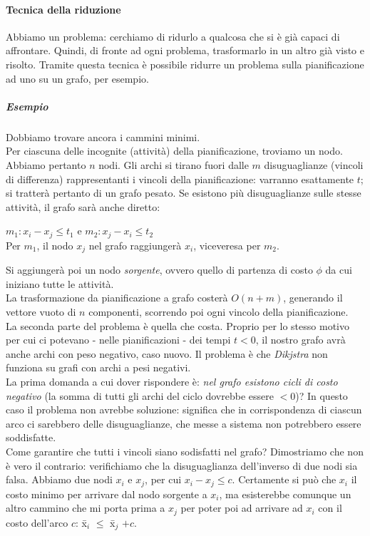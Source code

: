 \paragraph{Tecnica della riduzione}
Abbiamo un problema: cerchiamo di ridurlo a qualcosa che si è già capaci di affrontare. Quindi, di fronte ad ogni problema, trasformarlo in un altro già visto e risolto. Tramite questa tecnica è possibile ridurre un problema sulla pianificazione ad uno su un grafo, per esempio.
\subparagraph{Esempio}
Dobbiamo trovare ancora i cammini minimi. \\
Per ciascuna delle incognite (attività) della pianificazione, troviamo un nodo. Abbiamo pertanto $n$ nodi. Gli archi si tirano fuori dalle $m$ disuguaglianze (vincoli di differenza) rappresentanti i vincoli della pianificazione: varranno esattamente $t$; si tratterà pertanto di un grafo pesato. Se esistono più disuguaglianze sulle stesse attività, il grafo sarà anche diretto:
\begin{center}
	$m_1 : x_i - x_j \leq t_1$ e $m_2 : x_j - x_i \leq t_2$ \\
	Per $m_1$, il nodo $x_j$ nel grafo raggiungerà $x_i$, viceveresa per $m_2$.
\end{center}
Si aggiungerà poi un nodo \textit{sorgente}, ovvero quello di partenza di costo $\phi$ da cui iniziano tutte le attività. \\
La trasformazione da pianificazione a grafo costerà $O(n+m)$, generando il vettore vuoto di $n$ componenti, scorrendo poi ogni vincolo della pianificazione. \\
La seconda parte del problema è quella che costa. Proprio per lo stesso motivo per cui ci potevano - nelle pianificazioni - dei tempi $t < 0$, il nostro grafo avrà anche archi con peso negativo, caso nuovo. Il problema è che \textit{Dikjstra} non funziona su grafi con archi a pesi negativi. \\
La prima domanda a cui dover rispondere è: \textit{nel grafo esistono cicli di costo negativo} (la somma di tutti gli archi del ciclo dovrebbe essere $< 0$)? In questo caso il problema non avrebbe soluzione: significa che in corrispondenza di ciascun arco ci sarebbero delle disuguaglianze, che messe a sistema non potrebbero essere soddisfatte. \\
Come garantire che tutti i vincoli siano sodisfatti nel grafo? Dimostriamo che non è vero il contrario: verifichiamo che la disuguaglianza dell'inverso di due nodi sia falsa. Abbiamo due nodi $x_i$ e $x_j$, per cui $x_i - x_j \leq c$. Certamente si può che $x_i$ il costo minimo per arrivare dal nodo sorgente a $x_i$, ma esisterebbe comunque un altro cammino che mi porta prima a $x_j$ per poter poi ad arrivare ad $x_i$ con il costo dell'arco $c$: \={x$_i$} $\leq$ \={x$_j$} $+ c$. \\
